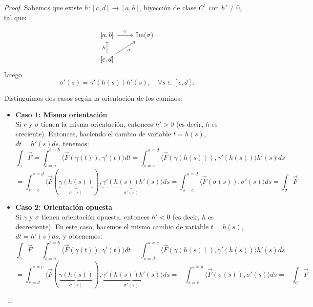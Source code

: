 \begin{proof}
    Sabemos que existe $h: [c,d] \to [a,b]$, biyección de clase $C^1$ con $h' \neq 0$, tal que:

    \[
        \begin{tikzcd}
            {[a,b]} \arrow[r, "\gamma"] & \operatorname{Im}(\sigma) \\
            {[c,d]} \arrow[u, "h"] \arrow[ur, "\sigma"']
        \end{tikzcd}
    \]
    Luego
    \[ \sigma'(s) = \gamma'(h(s)) h'(s), \quad \forall s \in [c,d]. \]

    Distinguimos dos casos según la orientación de los caminos:

    \begin{itemize}
        \item \textbf{Caso 1: Misma orientación}\\
              Si $r$ y $\sigma$ tienen la misma orientación, entonces $h' > 0$ (es decir, $h$ es creciente). Entonces, haciendo el cambio de variable $t = h(s)$, $dt = h'(s) ds$, tenemos:
              \[
                  \int_{\gamma} \vec{F} = \int_{t=a}^{t=b} \langle \vec{F} (\gamma (t)), \gamma'(t) \rangle dt = \int_{s=c}^{s=d} \langle \vec{F} (\gamma(h(s))), \gamma'(h(s)) \rangle h'(s) ds
              \]
              \[
                  = \int_{s=c}^{s=d} \langle \vec{F} (\underbrace{\gamma(h(s))}_{\sigma(s)}), \underbrace{\gamma'(h(s)) h'(s)}_{\sigma'(s)} \rangle ds = \int_{s=c}^{s=d} \langle \vec{F} (\sigma(s)), \sigma'(s) \rangle ds = \int_{\sigma} \vec{F}
              \]

        \item \textbf{Caso 2: Orientación opuesta}\\
              Si $\gamma$ y $\sigma$ tienen orientación opuesta, entonces $h' < 0$ (es decir, $h$ es decreciente). En este caso, hacemos el mismo cambio de variable $t = h(s)$, $dt = h'(s) ds$, y obtenemos:
              \[
                  \int_{\gamma} \vec{F} = \int_{t=a}^{t=b} \langle \vec{F} (\gamma(t)), \gamma'(t) \rangle dt = \int_{s=d}^{s=c} \langle \vec{F} (\gamma(h(s))), \gamma'(h(s)) \rangle h'(s) ds
              \]
              \[
                  = \int_{s=d}^{s=c} \langle \vec{F} (\underbrace{\gamma(h(s))}_{\sigma(s)}), \underbrace{\gamma'(h(s)) h'(s)}_{\sigma'(s)} \rangle ds = -\int_{s=c}^{s=d} \langle \vec{F} (\sigma(s)), \sigma'(s) \rangle ds = -\int_{\sigma} \vec{F}
              \]
    \end{itemize}
\end{proof}

